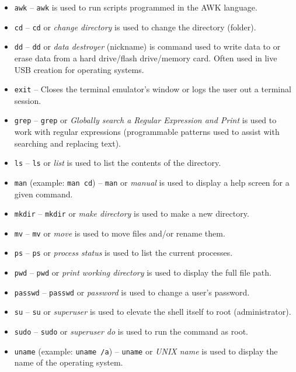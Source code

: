 \documentclass{article}
\begin{document}
\begin{itemize}    

\item \texttt{awk} -- \texttt{awk} is used to run scripts programmed in the AWK language.
\item \texttt{cd} -- \texttt{cd} or \textit{change directory} is used to change the directory (folder).
\item \texttt{dd} -- \texttt{dd} or \textit{data destroyer} (nickname) is command used to write data to or erase data from a hard drive/flash drive/memory card. Often used in live USB creation for operating systems.
\item \texttt{exit} -- Closes the terminal emulator's window or logs the user out a terminal session.
\item \texttt{grep} -- \texttt{grep} or \textit{Globally search a Regular Expression and Print} is used to work with regular expressions (programmable patterns used to assist with searching and replacing text).
\item \texttt{ls} -- \texttt{ls} or \textit{list} is used to list the contents of the directory.
\item \texttt{man} (example: \texttt{man cd}) -- \texttt{man} or \textit{manual} is used to display a help screen for a given command.
\item \texttt{mkdir} -- \texttt{mkdir} or \textit{make directory} is used to make a new directory.
\item \texttt{mv} -- \texttt{mv} or \textit{move} is used to move files and/or rename them.
\item \texttt{ps} -- \texttt{ps} or  \textit{process status} is used to list the current processes.
\item \texttt{pwd} -- \texttt{pwd} or \textit{print working directory} is used to display the full file path.
\item \texttt{passwd} -- \texttt{passwd} or \textit{password} is used to change a user's password.
\item \texttt{su} -- \texttt{su} or \textit{superuser} is used to elevate the shell itself to root (administrator).
\item \texttt{sudo} -- \texttt{sudo} or \textit{superuser do} is used to run the command as root.
\item \texttt{uname} (example: \texttt{uname /a}) -- \texttt{uname} or \textit{UNIX name} is used to display the name of the operating system.
\end{itemize}
\end{document}
